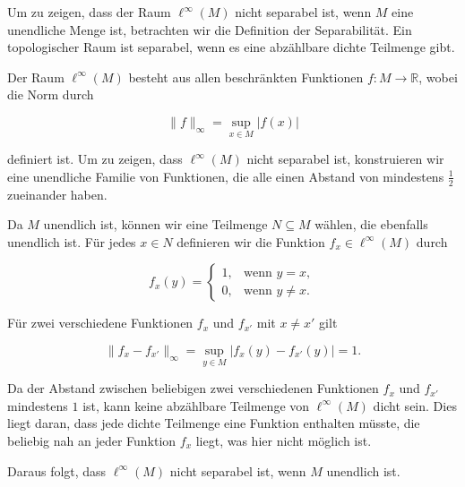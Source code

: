 Um zu zeigen, dass der Raum $\ell^{\infty}(M)$ nicht separabel ist, wenn $M$ eine unendliche Menge ist, betrachten wir die Definition der Separabilität. Ein topologischer Raum ist separabel, wenn es eine abzählbare dichte Teilmenge gibt.

Der Raum $\ell^{\infty}(M)$ besteht aus allen beschränkten Funktionen $f: M \to \mathbb{R}$, wobei die Norm durch

\[
\|f\|_{\infty} = \sup_{x \in M} |f(x)|
\]

definiert ist. Um zu zeigen, dass $\ell^{\infty}(M)$ nicht separabel ist, konstruieren wir eine unendliche Familie von Funktionen, die alle einen Abstand von mindestens $\frac{1}{2}$ zueinander haben.

Da $M$ unendlich ist, können wir eine Teilmenge $N \subseteq M$ wählen, die ebenfalls unendlich ist. Für jedes $x \in N$ definieren wir die Funktion $f_x \in \ell^{\infty}(M)$ durch

\[
f_x(y) = 
\begin{cases} 
1, & \text{wenn } y = x, \\
0, & \text{wenn } y \neq x.
\end{cases}
\]

Für zwei verschiedene Funktionen $f_x$ und $f_{x'}$ mit $x \neq x'$ gilt

\[
\|f_x - f_{x'}\|_{\infty} = \sup_{y \in M} |f_x(y) - f_{x'}(y)| = 1.
\]

Da der Abstand zwischen beliebigen zwei verschiedenen Funktionen $f_x$ und $f_{x'}$ mindestens $1$ ist, kann keine abzählbare Teilmenge von $\ell^{\infty}(M)$ dicht sein. Dies liegt daran, dass jede dichte Teilmenge eine Funktion enthalten müsste, die beliebig nah an jeder Funktion $f_x$ liegt, was hier nicht möglich ist.

Daraus folgt, dass $\ell^{\infty}(M)$ nicht separabel ist, wenn $M$ unendlich ist.